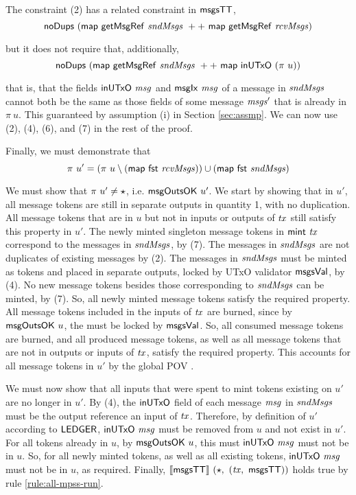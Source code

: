 The constraint (2) has a related constraint in $\mathsf{msgsTT}$,
\[\mathsf{noDups}~(\mathsf{map}~\mathsf{getMsgRef}~\mathit{sndMsgs}~++~\mathsf{map}~\mathsf{getMsgRef}~\mathit{rcvMsgs})\]

but it does not require that, additionally,
\[ \mathsf{noDups}~(\mathsf{map}~\mathsf{getMsgRef}~\mathit{sndMsgs}~++~\mathsf{map}~\mathsf{inUTxO}~(\pi~u)) \]

that is, that the fields $\mathsf{inUTxO}~\mathit{msg}$ and $\mathsf{msgIx}~\mathit{msg}$ of a message
in $\mathit{sndMsgs}$ cannot both be the same as those fields of some message $\mathit{msgs'}$
that is already in $\pi~u$. This guaranteed by assumption (i) in Section \ref{sec:assmp}.
We can now use (2), (4), (6), and (7) in the rest of the proof.

Finally, we must demonstrate that
\[\pi~u' = (\pi~u \setminus (\mathsf{map}~\mathsf{fst}~\mathit{rcvMsgs})) \cup (\mathsf{map}~\mathsf{fst}~\mathit{sndMsgs}) \]

We must show that $\pi~u' \neq \star$, i.e. $\mathsf{msgOutsOK}~u'$.
We start by showing that in $u'$, all message tokens are still in separate outputs
in quantity 1, with no duplication. All message tokens that are in $u$ but not in inputs or outputs
of $\mathit{tx}$ still satisfy this property in $u'$.
The newly minted singleton message tokens in $\mathsf{mint}~\mathit{tx}$ correspond to the messages
in $\mathit{sndMsgs}$, by (7). The messages in $\mathit{sndMsgs}$ are not
duplicates of existing messages by (2).
The messages in $\mathit{sndMsgs}$ must be minted as tokens
and placed in separate outputs, locked by UTxO validator $\mathsf{msgsVal}$, by (4).
No new message tokens besides those corresponding to $\mathit{sndMsgs}$ can be minted, by (7).
So, all newly minted
message tokens satisfy the required property. All message tokens included in the inputs of
$\mathit{tx}$ are burned, since by $\mathsf{msgOutsOK}~u$, the must be locked by $\mathsf{msgsVal}$.
So, all consumed message tokens are burned, and
all produced message tokens, as well as all message tokens that are not in outputs or
inputs of $\mathit{tx}$, satisfy the required property. This accounts for all message
tokens in $u'$ by the global POV \cite{structured}.

We must now show that all inputs that were spent to mint tokens existing on $u'$
are no longer in $u'$.
By (4), the $\mathsf{inUTxO}$ field of each message $\mathit{msg}$
in $\mathit{sndMsgs}$ must be the output reference an input of $\mathit{tx}$. Therefore,
by definition of $u'$ according to $\mathsf{LEDGER}$, $\mathsf{inUTxO}~\mathit{msg}$ must be removed from $u$
and not exist in $u'$. For all tokens already in $u$, by $\mathsf{msgOutsOK}~u$,
this must $\mathsf{inUTxO}~\mathit{msg}$ must not be in $u$. So, for all newly minted
tokens, as well as all existing tokens, $\mathsf{inUTxO}~\mathit{msg}$ must not be in $u$,
as required.
Finally, $\llbracket\mathsf{msgsTT}\rrbracket~(\star,~(\mathit{tx},~\mathsf{msgsTT}))$
holds true by rule \ref{rule:all-mpss-run}.

